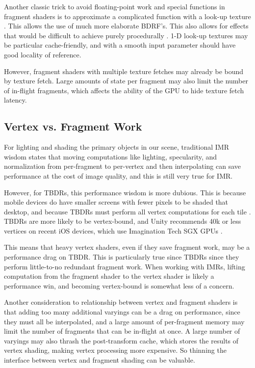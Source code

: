 Another classic trick to avoid floating-point work and special functions in
fragment shaders is to approximate a complicated function with a look-up
texture \cite{Pranckevicius11b}.  This allows the use of much more elaborate
BDRF's.  This also allows for effects that would be difficult to achieve purely
procedurally \cite{Mitchell07}.  1-D look-up textures may be particular
cache-friendly, and with a smooth input parameter should have good locality of
reference.  

However, fragment shaders with multiple texture fetches may already be bound by
texture fetch.  Large amounts of state per fragment may also limit the number
of in-flight fragments, which affects the ability of the GPU to hide texture
fetch latency.

\subsection{Vertex vs. Fragment Work}
\label{Jon-McCaffrey-Vertex-vs-Fragment-Work}

For lighting and shading the primary objects in our scene, traditional IMR
wisdom states that moving computations like lighting, specularity, and
normalization from per-fragment to per-vertex and then interpolating can save
performance at the cost of image quality, and this is still very true for IMR.

However, for TBDRs, this performance wisdom is more dubious.  This is because
mobile devices do have smaller screens with fewer pixels to be shaded that
desktop, and because TBDRs must perform all vertex computations for each tile
\cite{Apple11}.  TBDRs are more likely to be vertex-bound, and Unity
recommends 40k or less vertices on recent iOS devices, which use Imagination
Tech SGX GPUs \cite{unity_graphics_perf}.

This means that heavy vertex shaders, even if they save fragment work, may be a
performance drag on TBDR.  This is particularly true since TBDRs since they
perform little-to-no redundant fragment work.  When working with IMRs, lifting
computation from the fragment shader to the vertex shader is likely a
performance win, and becoming vertex-bound is somewhat less of a concern.

Another consideration to relationship between vertex and fragment shaders is
that adding too many additional varyings can be a drag on performance, since
they must all be interpolated, and a large amount of per-fragment memory may
limit the number of fragments that can be in-flight at once.  A large number of
varyings may also thrash the post-transform cache, which stores the results of
vertex shading, making vertex processing more expensive.  So thinning the
interface between vertex and fragment shading can be valuable.


